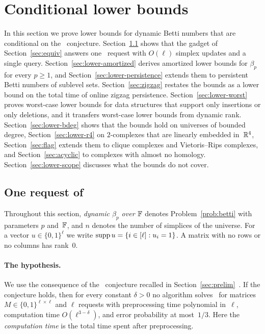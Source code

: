 \providecommand{\uMv}{\textsf{uMv}}
\section{Conditional lower bounds}\label{sec:lower}

In this section we prove lower bounds for dynamic Betti numbers that are conditional on the \OMv\ conjecture.
Section~\ref{sec:lower-round} shows that the gadget of Section~\ref{sec:equiv} answers one \OuMv\ request with $O(\ell)$ simplex updates and a single query.
Section~\ref{sec:lower-amortized} derives amortized lower bounds for $\beta_p$ for every $p\ge1$, and Section~\ref{sec:lower-persistence} extends them to persistent Betti numbers of sublevel sets.
Section~\ref{sec:zigzag} restates the bounds as a lower bound on the total time of online zigzag persistence.
Section~\ref{sec:lower-worst} proves worst-case lower bounds for data structures that support only insertions or only deletions, and it transfers worst-case lower bounds from dynamic rank.
Section~\ref{sec:lower-bdeg} shows that the bounds hold on universes of bounded degree, Section~\ref{sec:lower-r4} on $2$-complexes that are linearly embedded in~$\mathbb{R}^4$, Section~\ref{sec:flag} extends them to clique complexes and Vietoris--Rips complexes, and Section~\ref{sec:acyclic} to complexes with almost no homology.
Section~\ref{sec:lower-scope} discusses what the bounds do not cover.

\subsection{One request of \OuMv}\label{sec:lower-round}

Throughout this section, \emph{dynamic $\beta_p$ over $\mathbb{F}$} denotes Problem~\ref{prob:betti} with parameters $p$ and~$\mathbb{F}$, and $n$ denotes the number of simplices of the universe.
For a vector $u\in\{0,1\}^{\ell}$ we write ${\operatorname{supp} u=\{i\in[\ell]:u_i=1\}}$.
A matrix with no rows or no columns has rank~$0$.

\paragraph{The hypothesis.}
We use the consequence of the \OMv\ conjecture recalled in Section~\ref{sec:prelim}~\cite[Theorem~2.7]{HKNS15full}.
If the conjecture holds, then for every constant $\delta>0$ no algorithm solves \OuMv\ for matrices $M\in\{0,1\}^{\ell\times\ell}$ and $\ell$ requests with preprocessing time polynomial in~$\ell$, computation time $O(\ell^{3-\delta})$, and error probability at most~$1/3$.
Here the \emph{computation time} is the total time spent after preprocessing.

